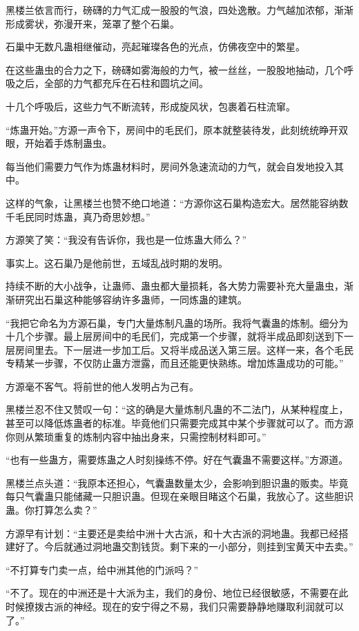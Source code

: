 \begin{this_body}
黑楼兰依言而行，磅礴的力气汇成一股股的气浪，四处逸散。力气越加浓郁，渐渐形成雾状，弥漫开来，笼罩了整个石巢。

石巢中无数凡蛊相继催动，亮起璀璨各色的光点，仿佛夜空中的繁星。

在这些蛊虫的合力之下，磅礴如雾海般的力气，被一丝丝，一股股地抽动，几个呼吸之后，全部的力气都充斥在石柱和圆坑之间。

十几个呼吸后，这些力气不断流转，形成旋风状，包裹着石柱流窜。

“炼蛊开始。”方源一声令下，房间中的毛民们，原本就整装待发，此刻统统睁开双眼，开始着手炼制蛊虫。

每当他们需要力气作为炼蛊材料时，房间外急速流动的力气，就会自发地投入其中。

这样的气象，让黑楼兰也赞不绝口地道：“方源你这石巢构造宏大。居然能容纳数千毛民同时炼蛊，真乃奇思妙想。”

方源笑了笑：“我没有告诉你，我也是一位炼蛊大师么？”

事实上。这石巢乃是他前世，五域乱战时期的发明。

持续不断的大小战争，让蛊师、蛊虫都大量损耗，各大势力需要补充大量蛊虫，渐渐研究出石巢这种能够容纳许多蛊师，一同炼蛊的建筑。

“我把它命名为方源石巢，专门大量炼制凡蛊的场所。我将气囊蛊的炼制。细分为十几个步骤。最上层房间中的毛民们，完成第一个步骤，就将半成品即刻送到下一层房间里去。下一层进一步加工后。又将半成品送入第三层。这样一来，各个毛民专精某一步骤，不仅防止蛊方泄露，而且还能更快熟练。增加炼蛊成功的可能。”

方源毫不客气。将前世的他人发明占为己有。

黑楼兰忍不住又赞叹一句：“这的确是大量炼制凡蛊的不二法门，从某种程度上，甚至可以降低炼蛊者的标准。毕竟他们只需要完成其中某个步骤就可以了。而方源你则从繁琐重复的炼制内容中抽出身来，只需控制材料即可。”

“也有一些蛊方，需要炼蛊之人时刻操练不停。好在气囊蛊不需要这样。”方源道。

黑楼兰点头道：“我原本还担心，气囊蛊数量太少，会影响到胆识蛊的贩卖。毕竟每只气囊蛊只能储藏一只胆识蛊。但现在亲眼目睹这个石巢，我放心了。这些胆识蛊。你打算怎么卖？”

方源早有计划：“主要还是卖给中洲十大古派，和十大古派的洞地蛊。我都已经搭建好了。今后就通过洞地蛊交割钱货。剩下来的一小部分，则挂到宝黄天中去卖。”

“不打算专门卖一点，给中洲其他的门派吗？”

“不了。现在的中洲还是十大派为主，我们的身份、地位已经很敏感，不需要在此时候撩拨古派的神经。现在的安宁得之不易，我们只需要静静地赚取利润就可以了。”


\end{this_body}
